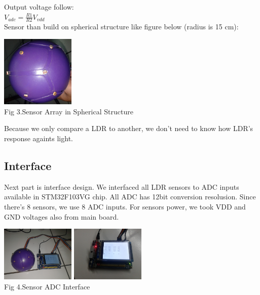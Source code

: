 \documentclass[journal]{IEEEtran}
\begin{document}
Output voltage follow:\\

$V_{adc} = \frac{R1}{R2} V_{vdd}$\\

Sensor than build on spherical structure like figure below (radius is 15 cm):\\

\begin{center} 
\includegraphics[width=100pt]{sensorball}\\
Fig 3.Sensor Array in Spherical Structure
\end{center}

Because we only compare a LDR to another, we don't need to know how LDR's response againts light.

\subsection{Interface}

Next part is interface design. 
We interfaced all LDR sensors to ADC inputs available in STM32F103VG chip.
All ADC has 12bit conversion resolusion.
Since there's 8 sensors, we use 8 ADC inputs.
For sensors power, we took VDD and GND voltages also from main board.\\

\begin{center} 
\includegraphics[width=100pt]{wiring}
\includegraphics[width=100pt]{interface}\\
Fig 4.Sensor ADC Interface
\end{center}
\end{document}
